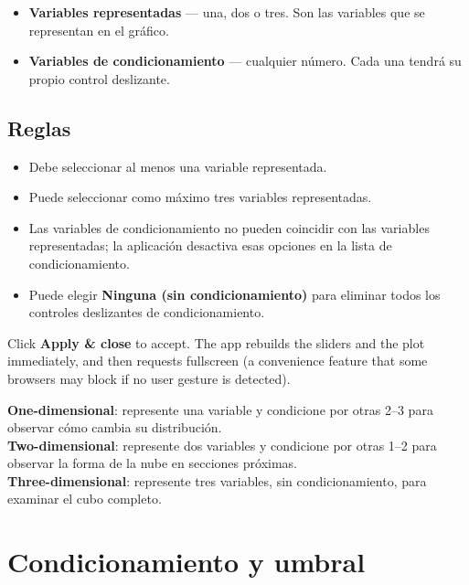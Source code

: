 \documentclass[11pt,a4paper]{article}
\begin{document}
\begin{itemize}[leftmargin=1.4em]
  \item \textbf{Variables representadas} --- una, dos o tres. Son las variables que se representan en el gráfico.
  \item \textbf{Variables de condicionamiento} --- cualquier número. Cada una tendrá su propio control deslizante.
\end{itemize}

\subsection{Reglas}

\begin{itemize}[leftmargin=1.4em]
  \item Debe seleccionar al menos una variable representada.
  \item Puede seleccionar como máximo tres variables representadas.
  \item Las variables de condicionamiento no pueden coincidir con las variables representadas; la aplicación desactiva esas opciones en la lista de condicionamiento.
  \item Puede elegir \textbf{Ninguna (sin condicionamiento)} para eliminar todos los controles deslizantes de condicionamiento.
\end{itemize}

Click \textbf{Apply \& close} to accept. The app rebuilds the sliders and the plot immediately, and then requests fullscreen (a convenience feature that some browsers may block if no user gesture is detected).

\begin{tipbox}
\textbf{One-dimensional}: represente una variable y condicione por otras 2--3 para observar cómo cambia su distribución. \\
\textbf{Two-dimensional}: represente dos variables y condicione por otras 1--2 para observar la forma de la nube en secciones próximas. \\
\textbf{Three-dimensional}: represente tres variables, sin condicionamiento, para examinar el cubo completo.
\end{tipbox}

\section{Condicionamiento y umbral}
\end{document}
